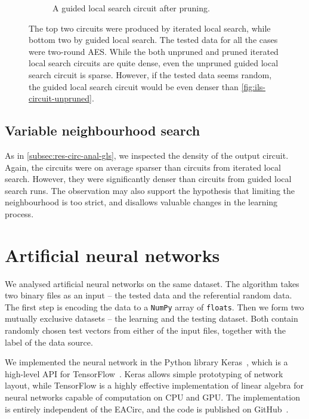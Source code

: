 \documentclass[
  print, %
  Table,   %
  nolof,     %
  nolot,     %
  11pt, %
  oneside  %
]{fithesis3}
\begin{document}
\begin{figure}
\begin{changemargin}{-3cm}{-3cm}
\begin{subfigure}{.65\textwidth}
  \caption{A guided local search circuit after pruning.}
  \label{fig:gls-circuit-pruned}
\end{subfigure}
\end{changemargin}
\caption{The top two circuits were produced by iterated local search, while bottom two by guided local search. The tested data for all the cases were two-round AES. While the both unpruned and pruned iterated local search circuits are quite dense, even the unpruned guided local search circuit is sparse. However, if the tested data seems random, the guided local search circuit would be even denser than \cref{fig:ils-circuit-unpruned}.}
\label{fig:ils-gls-circuits}
\end{figure}

\subsection{Variable neighbourhood search}
\label{subsec:res-circ-anal-vns}

As in \cref{subsec:res-circ-anal-gls}, we inspected the density of the output circuit. Again, the circuits were on average sparser than circuits from iterated local search. However, they were significantly denser than circuits from guided local search runs. The observation may also support the hypothesis that limiting the neighbourhood is too strict, and disallows valuable changes in the learning process.



\section{Artificial neural networks}
\label{sec:res-ann}

We analysed artificial neural networks on the same dataset. The algorithm takes two binary files as an input -- the tested data and the referential random data. The first step is encoding the data to a \texttt{NumPy} array of \texttt{floats}. Then we form two mutually exclusive datasets -- the learning and the testing dataset. Both contain randomly chosen test vectors from either of the input files, together with the label of the data source.

We implemented the neural network in the Python library Keras~\cite{chollet2015keras}, which is a high-level API for TensorFlow~\cite{abadi2016tensorflow}. Keras allows simple prototyping of network layout, while TensorFlow is a highly effective implementation of linear algebra for neural networks capable of computation on CPU and GPU. The implementation is entirely independent of the EACirc, and the code is published on GitHub~\cite{EANet}.
\end{document}
